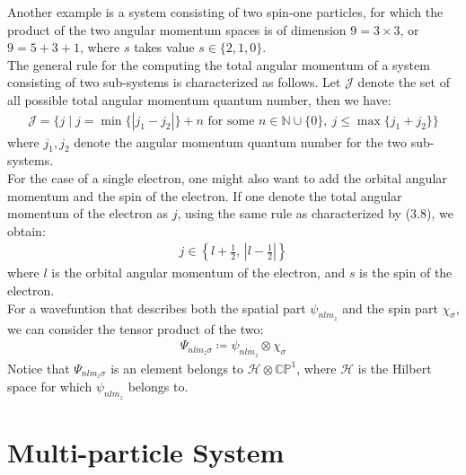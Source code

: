 \documentclass[11pt]{book}
\theoremstyle{break}
\theoremstyle{break}
\newcommand{\N}{\mathbb{N}}
\newcommand{\C}{\mathbb{C}}
\begin{document}
Another example is a system consisting of two spin-one particles, for which the product of the two angular momentum spaces is of dimension $9 = 3\times 3$, or $9 = 5+3+1$, where $s$ takes value $s \in \{2,1,0\}$. \\

The general rule for the computing the total angular momentum of a system consisting of two sub-systems is characterized as follows. Let $\mathcal{J}$ denote the set of all possible total angular momentum quantum number, then we have:
\begin{align}
\mathcal{J} = \{j\mid j = \min\{|j_1-j_2|\}+n \text{ for some }n\in \N\cup \{0\},\ j\leq \max\{j_1+j_2\} \}
\end{align}
where $j_1,j_2$ denote the angular momentum quantum number for the two  sub-systems. \\


For the case of a single electron, one might also want to add the orbital angular momentum and the spin of the electron. If one denote the total angular momentum of the electron as $j$, using the same rule as characterized by (3.8), we obtain:
\begin{align*}
j\in \left\{ l+\frac{1}{2},\, \left|l-\frac{1}{2}\right| \right\}
\end{align*}
where $l$ is the orbital angular momentum of the electron, and $s$ is the spin of the electron. \\


For a wavefuntion that describes both the spatial part $\psi_{nlm_z}$ and the spin part $\chi_\sigma$, we can consider the tensor product of the two:
\begin{align*}
\Psi_{nlm_z\sigma} \coloneqq \psi_{nlm_z} \otimes \chi_{\sigma}
\end{align*}
Notice that $\Psi_{nlm_z\sigma}$ is an element belongs to $\mathcal{H}\otimes \C\mathbb{P}^1$, where $\mathcal{H}$ is the Hilbert space for which $\psi_{nlm_z}$ belongs to.  


\newpage
\chapter{Multi-particle System}
\end{document}
